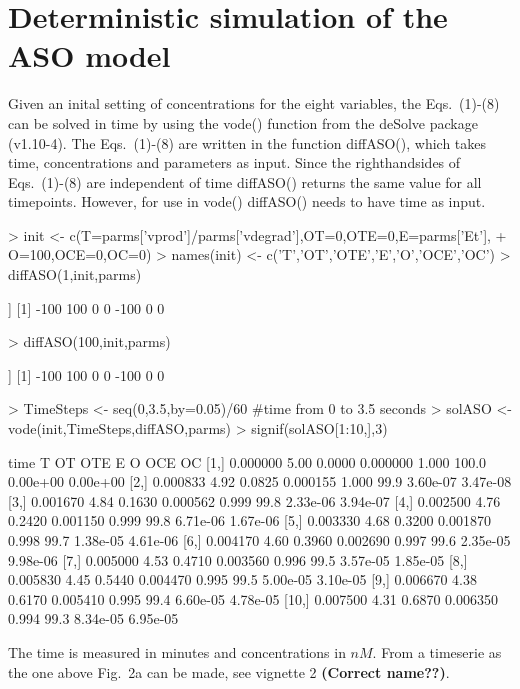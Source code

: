 \documentclass[a4paper,11pt]{article}
\begin{document}
\section{Deterministic simulation of the ASO model}
Given an inital setting of concentrations for the eight variables, the Eqs.~(1)-(8) can be solved in time by using the vode() function from the deSolve package (v1.10-4). The Eqs.~(1)-(8) are written in the function diffASO(), which takes time, concentrations and parameters as input. Since the righthandsides of Eqs.~(1)-(8) are independent of time diffASO() returns the same value for all timepoints. However, for use in vode() diffASO() needs to have time as input.
\begin{Schunk}
\begin{Sinput}
> init <- c(T=parms['vprod']/parms['vdegrad'],OT=0,OTE=0,E=parms['Et'],
+           O=100,OCE=0,OC=0)
> names(init) <- c('T','OT','OTE','E','O','OCE','OC')
> diffASO(1,init,parms)
\end{Sinput}
\begin{Soutput}
[[1]]
[1] -100  100    0    0 -100    0    0
\end{Soutput}
\begin{Sinput}
> diffASO(100,init,parms)
\end{Sinput}
\begin{Soutput}
[[1]]
[1] -100  100    0    0 -100    0    0
\end{Soutput}
\begin{Sinput}
> TimeSteps <- seq(0,3.5,by=0.05)/60 #time from 0 to 3.5 seconds
> solASO <- vode(init,TimeSteps,diffASO,parms)
> signif(solASO[1:10,],3)
\end{Sinput}
\begin{Soutput}
          time    T     OT      OTE     E     O      OCE       OC
 [1,] 0.000000 5.00 0.0000 0.000000 1.000 100.0 0.00e+00 0.00e+00
 [2,] 0.000833 4.92 0.0825 0.000155 1.000  99.9 3.60e-07 3.47e-08
 [3,] 0.001670 4.84 0.1630 0.000562 0.999  99.8 2.33e-06 3.94e-07
 [4,] 0.002500 4.76 0.2420 0.001150 0.999  99.8 6.71e-06 1.67e-06
 [5,] 0.003330 4.68 0.3200 0.001870 0.998  99.7 1.38e-05 4.61e-06
 [6,] 0.004170 4.60 0.3960 0.002690 0.997  99.6 2.35e-05 9.98e-06
 [7,] 0.005000 4.53 0.4710 0.003560 0.996  99.5 3.57e-05 1.85e-05
 [8,] 0.005830 4.45 0.5440 0.004470 0.995  99.5 5.00e-05 3.10e-05
 [9,] 0.006670 4.38 0.6170 0.005410 0.995  99.4 6.60e-05 4.78e-05
[10,] 0.007500 4.31 0.6870 0.006350 0.994  99.3 8.34e-05 6.95e-05
\end{Soutput}
\end{Schunk}
The time is measured in minutes and concentrations in $nM$. From a timeserie as the one above Fig.~2a can be made, see vignette 2 \textbf{(Correct name??)}.  
\end{document}
